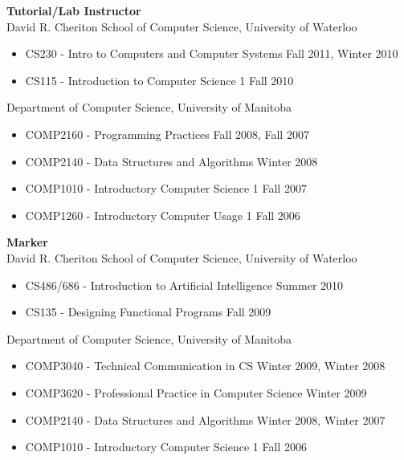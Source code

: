 \documentclass[line,margin]{res}
\begin{document}
\begin{resume}
  {\bf Tutorial/Lab Instructor} \vspace{4pt} \\
  David R. Cheriton School of Computer Science, University of Waterloo
  \begin{itemize}  \itemsep -2pt %
    \item CS230 - Intro to Computers and Computer Systems \hfill Fall 2011, Winter 2010
    \item CS115 - Introduction to Computer Science 1 \hfill Fall 2010
  \end{itemize} \vspace{-8pt}
  Department of Computer Science, University of Manitoba
  \begin{itemize}  \itemsep -2pt %
    \item COMP2160 - Programming Practices \hfill Fall 2008, Fall 2007
    \item COMP2140 - Data Structures and Algorithms \hfill Winter 2008
    \item COMP1010 - Introductory Computer Science 1 \hfill Fall 2007
    \item COMP1260 - Introductory Computer Usage 1 \hfill Fall 2006
  \end{itemize}
  
  {\bf Marker} \vspace{4pt} \\
  David R. Cheriton School of Computer Science, University of Waterloo
  \begin{itemize}  \itemsep -2pt %
    \item CS486/686 - Introduction to Artificial Intelligence \hfill Summer 2010
    \item CS135 - Designing Functional Programs \hfill Fall 2009
  \end{itemize} \vspace{-8pt}
  Department of Computer Science, University of Manitoba
  \begin{itemize}  \itemsep -2pt %
    \item COMP3040 - Technical Communication in CS \hfill Winter 2009, Winter 2008
    \item COMP3620 - Professional Practice in Computer Science \hfill Winter 2009
    \item COMP2140 - Data Structures and Algorithms \hfill Winter 2008, Winter 2007
    \item COMP1010 - Introductory Computer Science 1 \hfill Fall 2006
  \end{itemize}


\end{resume}
\end{document}
